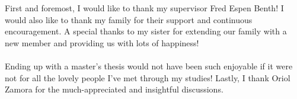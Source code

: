 \begin{acknowledgements}
\markboth{}{} %
First and foremost, I would like to thank my supervisor Fred Espen Benth! I would also like to thank my family for their support and continuous encouragement. A special thanks to my sister for extending our family with a new member and providing us with lots of happiness!
\\~\\
Ending up with a master's thesis would not have been such enjoyable if it were not for all the lovely people I've met through my studies! Lastly, I thank Oriol Zamora for the much-appreciated and insightful discussions. 
\end{acknowledgements}